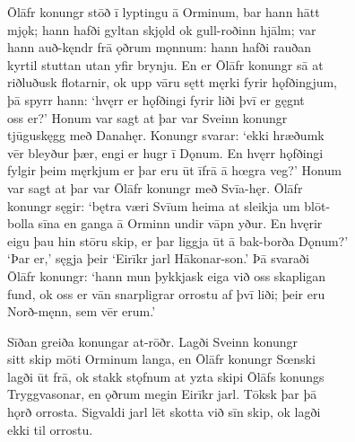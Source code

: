 \documentclass[12pt,letterpaper]{book}
\begin{document}
\begin{linenumbers}
Ōlāfr konungr stōð ī lyptingu ā Orminum, bar hann hātt\\
mjǫk; hann hafði gyltan skjǫld ok gull-roðinn hjālm; var\\
hann auð-kęndr frā ǫðrum mǫnnum: hann hafði rauðan\\
kyrtil stuttan utan yfir brynju.  En er Ōlāfr konungr sā at\\
riðluðusk flotarnir, ok upp vāru sętt męrki fyrir hǫfðingjum,\\
þā spyrr hann: `hvęrr er hǫfðingi fyrir liði þvī er gęgnt\\
oss er?'  Honum var sagt at þar var Sveinn konungr\\
tjūguskęgg með Danahęr.  Konungr svarar: `ekki hræðumk\\
vēr bleyður þær, engi er hugr ī Dǫnum.  En hvęrr hǫfðingi\\
fylgir þeim męrkjum er þar eru ūt īfrā ā hœgra veg?'  Honum\\
var sagt at þar var Ōlāfr konungr með Svīa-hęr.  Ōlāfr\\
konungr sęgir: `bętra væri Svīum heima at sleikja um blōt-\\
bolla sīna en ganga ā Orminn undir vāpn yður.  En hvęrir\\
eigu þau hin stōru skip, er þar liggja ūt ā bak-borða Dǫnum?'\\
`Þar er,' sęgja þeir `Eirīkr jarl Hākonar-son.'  Þā svaraði\\
Ōlāfr konungr: `hann mun þykkjask eiga við oss skapligan\\
fund, ok oss er vān snarpligrar orrostu af þvī liði; þeir eru\\
Norð-męnn, sem vēr erum.'

Sīðan greiða konungar at-rōðr.  Lagði Sveinn konungr\\
sitt skip mōti Orminum langa, en Ōlāfr konungr Sœnski\\
lagði ūt frā, ok stakk stǫfnum at yzta skipi Ōlāfs konungs\\
Tryggvasonar, en ǫðrum megin Eirīkr jarl.  Tōksk þar þā\\
hǫrð orrosta.  Sigvaldi jarl lēt skotta við sīn skip, ok lagði\\
ekki til orrostu.


\end{linenumbers}
\end{document}
